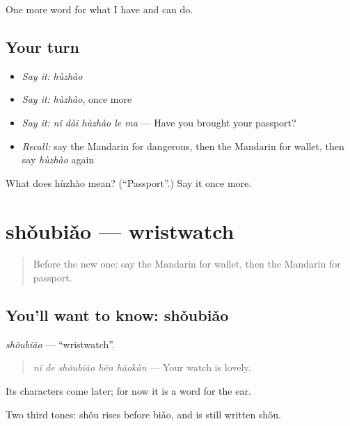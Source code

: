 \begin{grammarlens}[title={What you've built}]
One more word for what I have and can do.
\end{grammarlens}

\subsection*{Your turn}
\begin{itemize}
\raggedright
  \item \emph{Say it:} \emph{hùzhào}
  \item \emph{Say it:} \emph{hùzhào}, once more
  \item \emph{Say it:} \emph{nǐ dài hùzhào le ma} — Have you brought your passport?
  \item \emph{Recall:} say the Mandarin for dangerous, then the Mandarin for wallet, then say \emph{hùzhào} again
\end{itemize}

\begin{tcolorbox}[breakable,colback=teal!4,colframe=teal!35!black,title={Before you move on}]
What does hùzhào mean? (\textquotedblleft{}Passport\textquotedblright{}.) Say it once more.
\end{tcolorbox}
\section[shǒubiǎo]{shǒubiǎo — wristwatch}

\label{lesson:ZH-C116-shoubiao}



\begin{quote}
Before the new one: say the Mandarin for wallet, then the Mandarin for passport.
\end{quote}

\subsection*{You'll want to know: shǒubiǎo}
\emph{shǒubiǎo} — \textquotedblleft{}wristwatch\textquotedblright{}.

\begin{quote}
\emph{nǐ de shǒubiǎo hěn hǎokàn} — Your watch is lovely.
\end{quote}

Its characters come later; for now it is a word for the ear.

Two third tones: shǒu rises before biǎo, and is still written shǒu.

